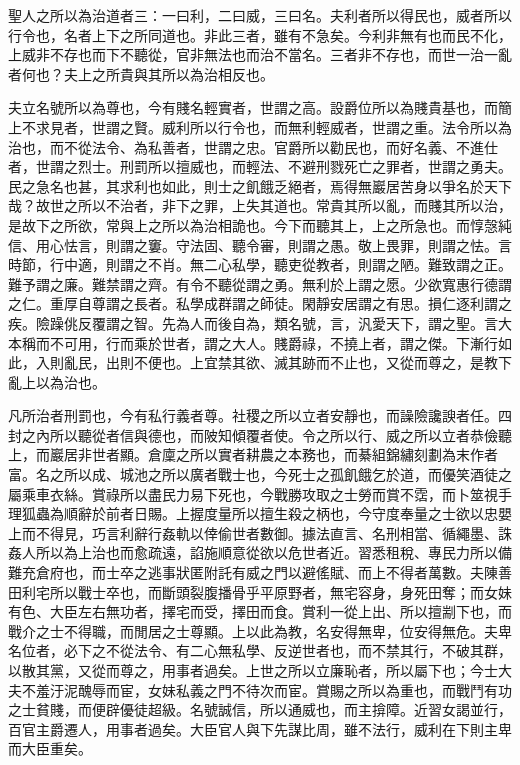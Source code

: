 
\begin{pinyinscope}
聖人之所以為治道者三：一曰利，二曰威，三曰名。夫利者所以得民也，威者所以行令也，名者上下之所同道也。非此三者，雖有不急矣。今利非無有也而民不化，上威非不存也而下不聽從，官非無法也而治不當名。三者非不存也，而世一治一亂者何也？夫上之所貴與其所以為治相反也。

夫立名號所以為尊也，今有賤名輕實者，世謂之高。設爵位所以為賤貴基也，而簡上不求見者，世謂之賢。威利所以行令也，而無利輕威者，世謂之重。法令所以為治也，而不從法令、為私善者，世謂之忠。官爵所以勸民也，而好名義、不進仕者，世謂之烈士。刑罰所以擅威也，而輕法、不避刑戮死亡之罪者，世謂之勇夫。民之急名也甚，其求利也如此，則士之飢餓乏絕者，焉得無巖居苦身以爭名於天下哉？故世之所以不治者，非下之罪，上失其道也。常貴其所以亂，而賤其所以治，是故下之所欲，常與上之所以為治相詭也。今下而聽其上，上之所急也。而惇愨純信、用心怯言，則謂之窶。守法固、聽令審，則謂之愚。敬上畏罪，則謂之怯。言時節，行中適，則謂之不肖。無二心私學，聽吏從教者，則謂之陋。難致謂之正。難予謂之廉。難禁謂之齊。有令不聽從謂之勇。無利於上謂之愿。少欲寬惠行德謂之仁。重厚自尊謂之長者。私學成群謂之師徒。閑靜安居謂之有思。損仁逐利謂之疾。險躁佻反覆謂之智。先為人而後自為，類名號，言，汎愛天下，謂之聖。言大本稱而不可用，行而乘於世者，謂之大人。賤爵祿，不撓上者，謂之傑。下漸行如此，入則亂民，出則不便也。上宜禁其欲、滅其跡而不止也，又從而尊之，是教下亂上以為治也。

凡所治者刑罰也，今有私行義者尊。社稷之所以立者安靜也，而譟險讒諛者任。四封之內所以聽從者信與德也，而陂知傾覆者使。令之所以行、威之所以立者恭儉聽上，而巖居非世者顯。倉廩之所以實者耕農之本務也，而綦組錦繡刻劃為末作者富。名之所以成、城池之所以廣者戰士也，今死士之孤飢餓乞於道，而優笑酒徒之屬乘車衣絲。賞祿所以盡民力易下死也，今戰勝攻取之士勞而賞不霑，而卜筮視手理狐蟲為順辭於前者日賜。上握度量所以擅生殺之柄也，今守度奉量之士欲以忠嬰上而不得見，巧言利辭行姦軌以倖偷世者數御。據法直言、名刑相當、循繩墨、誅姦人所以為上治也而愈疏遠，諂施順意從欲以危世者近。習悉租稅、專民力所以備難充倉府也，而士卒之逃事狀匿附託有威之門以避傜賦、而上不得者萬數。夫陳善田利宅所以戰士卒也，而斷頭裂腹播骨乎平原野者，無宅容身，身死田奪；而女妹有色、大臣左右無功者，擇宅而受，擇田而食。賞利一從上出、所以擅剬下也，而戰介之士不得職，而閒居之士尊顯。上以此為教，名安得無卑，位安得無危。夫卑名位者，必下之不從法令、有二心無私學、反逆世者也，而不禁其行，不破其群，以散其黨，又從而尊之，用事者過矣。上世之所以立廉恥者，所以屬下也；今士大夫不羞汙泥醜辱而宦，女妹私義之門不待次而宦。賞賜之所以為重也，而戰鬥有功之士貧賤，而便辟優徒超級。名號誠信，所以通威也，而主揜障。近習女謁並行，百官主爵遷人，用事者過矣。大臣官人與下先謀比周，雖不法行，威利在下則主卑而大臣重矣。


\end{pinyinscope}
